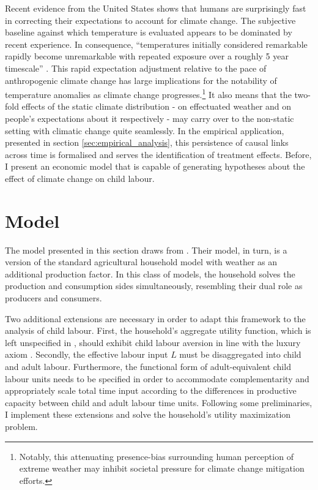 \documentclass[a4paper,12pt]{article}
\theoremstyle{plain}
\theoremstyle{definition}
\theoremstyle{definition}
\theoremstyle{definition}
\theoremstyle{definition}
\begin{document}
Recent evidence from the United States shows that humans are surprisingly fast in correcting their expectations to account for climate change. The subjective baseline against which temperature is evaluated appears to be dominated by recent experience. In consequence, ``temperatures initially considered remarkable rapidly become unremarkable with repeated exposure over a roughly 5 year timescale'' \citep{Moore2019}. This rapid expectation adjustment relative to the pace of anthropogenic climate change has large implications for the notability of temperature anomalies as climate change progresses.\footnote{Notably, this attenuating presence-bias surrounding human perception of extreme weather may inhibit societal pressure for climate change mitigation efforts.} It also means that the two-fold effects of the static climate distribution - on effectuated weather and on people's expectations about it respectively - may carry over to the non-static setting with climatic change quite seamlessly. In the empirical application, presented in section \ref{sec:empirical_analysis}, this persistence of causal links across time is formalised and serves the identification of treatment effects. Before, I present an economic model that is capable of generating hypotheses about the effect of climate change on child labour.

\section{Model}
\label{sec:model}

The model presented in this section draws from \citet{Jessoe2018}. Their model, in turn, is a version of the standard agricultural household model \citep{Singgh1986} with weather as an additional production factor. In this class of models, the household solves the production and consumption sides simultaneously, resembling their dual role as producers and consumers.

Two additional extensions are necessary in order to adapt this framework to the analysis of child labour. First, the household's aggregate utility function, which is left unspecified in 
\citet{Jessoe2018}, should exhibit child labour aversion in line with the luxury axiom \citep{Basu1998}. Secondly, the effective labour input $L$ must be disaggregated into child and adult labour. Furthermore, the functional form of adult-equivalent child labour units needs to be specified in order to accommodate complementarity and appropriately scale total time input according to the differences in productive capacity between child and adult labour time units. Following some preliminaries, I implement these extensions and solve the household's utility maximization problem.
\end{document}
